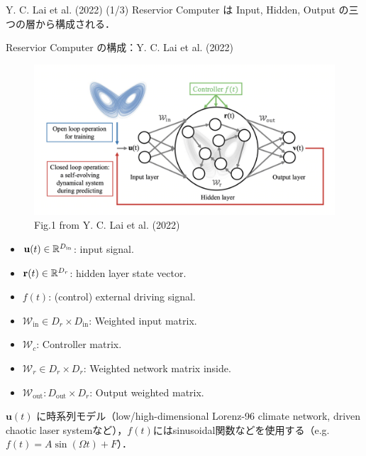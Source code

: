 \begin{frame}{Y. C. Lai et al. (2022) (1/3)}
    Reservior Computer は Input, Hidden, Output の三つの層から構成される．
    \begin{block}{Reservior Computer の構成：Y. C. Lai et al. (2022)}
    \vspace{0.1cm}
        \begin{minipage}{0.4\textwidth}
            \begin{figure}
                \includegraphics[width=\textwidth]{Fig/Fig.1_Lai.png}
                \caption*{Fig.1 from Y. C. Lai et al. (2022)}
                \label{Fig.1_Lai.png} %
            \end{figure}
        \end{minipage}%
        \begin{minipage}{0.6\textwidth}
            \begin{itemize}
                \item $\mathbf{u}(t) \in \mathbb{R}^{D_{\text{in}}}$: input signal. 
                \item $\mathbf{r}(t) \in \mathbb{R}^{D_r} $: hidden layer state vector.
                \item $f(t)$: (control) external driving signal.  
                \item $\mathcal{W}_{\text{in}} \in D_r \times D_{\text{in}}$: Weighted input matrix.  
                \item $\mathcal{W}_c$: Controller matrix.
                \item $ \mathcal{W}_r \in D_r \times D_{r}$: Weighted network matrix inside.
                \item $\mathcal{W}_{\text{out}}: D_{\text{out}} \times D_{r}$: Output weighted matrix.
            \end{itemize}
    \end{minipage}
    \end{block}
    $\mathbf{u}(t)$ に時系列モデル（low/high-dimensional Lorenz-96 climate network, driven chaotic laser systemなど），$f(t)$にはsinusoidal関数などを使用する（e.g. $f(t) = A \sin (\Omega t) + F$）．
\end{frame}

